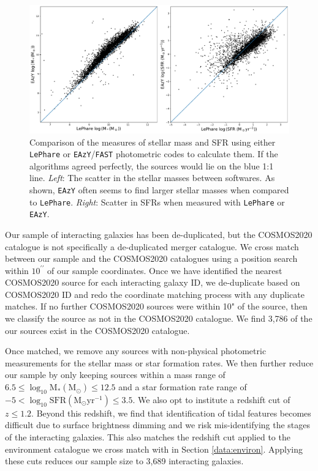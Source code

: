 \begin{figure}
\centering
\includegraphics[width=\textwidth]{Chapter3/figures/mass-sfr-scatter.pdf}
\caption[Comparison of the measures of stellar mass and SFR using either \texttt{LePhare} or \texttt{EAzY}/\texttt{FAST} photometric codes to calculate them.]{Comparison of the measures of stellar mass and SFR using either \texttt{LePhare} or \texttt{EAzY}/\texttt{FAST} photometric codes to calculate them. If the algorithms agreed perfectly, the sources would lie on the blue 1:1 line. \textit{Left}: The scatter in the stellar masses between softwares. As shown, \texttt{EAzY} often seems to find larger stellar masses when compared to \texttt{LePhare}. \textit{Right}: Scatter in SFRs when measured with \texttt{LePhare} or \texttt{EAzY}.}
\label{fig:difference-measures}
\end{figure}

Our sample of interacting galaxies has been de-duplicated, but the COSMOS2020 catalogue is not specifically a de-duplicated merger catalogue. We cross match between our sample and the COSMOS2020 catalogues using a position search within $10^{\prime\prime}$ of our sample coordinates. Once we have identified the nearest COSMOS2020 source for each interacting galaxy ID, we de-duplicate based on COSMOS2020 ID and redo the coordinate matching process with any duplicate matches. If no further COSMOS2020 sources were within 10" of the source, then we classify the source as not in the COSMOS2020 catalogue. We find 3,786 of the our sources exist in the COSMOS2020 catalogue.

Once matched, we remove any sources with non-physical photometric measurements for the stellar mass or star formation rates. We then further reduce our sample by only keeping sources within a mass range of $6.5 \leq \log_{10} \text{M}_{*}(\text{M}_{\odot}) \leq 12.5$ and a star formation rate range of $-5 < \log_{10} \text{SFR} (\text{M}_{\odot}\text{yr}^{-1}) \leq 3.5$. We also opt to institute a redshift cut of $z \leq 1.2$. Beyond this redshift, we find that identification of tidal features becomes difficult due to surface brightness dimming and we risk mis-identifying the stages of the interacting galaxies. This also matches the redshift cut applied to the environment catalogue we cross match with in Section \ref{data:environ}. Applying these cuts reduces our sample size to 3,689 interacting galaxies.

